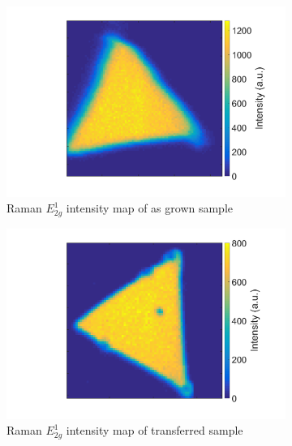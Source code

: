 \begin{figure}[ht] %
	\begin{center}
		\begin{subfigure}[b]{0.4\textwidth}
			\includegraphics[scale=0.15]{Transfer/TransferRamanIntensityEMapAsgrown.png}
			\caption{Raman $E^1_{2g}$ intensity map of as grown sample}
			\label{fig:TransferRamanIntensityEMapAsgrown}
		\end{subfigure}
		\quad
		\begin{subfigure}[b]{0.4\textwidth}
			\includegraphics[scale=0.15]{Transfer/TransferRamanIntensityEMapTransferred.png}
			\caption{Raman $E^1_{2g}$ intensity map of transferred sample}
			\label{fig:TransferRamanIntensityMapTransferred}
		\end{subfigure}
		\vfill
		\begin{subfigure}[b]{0.4\textwidth}

\end{subfigure}
\end{center}
\end{figure}
